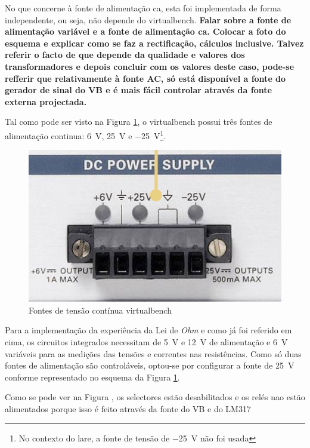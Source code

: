 No que concerne à fonte de alimentação \acrshort{ca}, esta foi implementada de forma independente, ou seja, não depende do \acrshort{virtualbench}. \textbf{Falar sobre a fonte de alimentação variável e a fonte de alimentação \acrshort{ca}. Colocar a foto do esquema e explicar como se faz a rectificação, cálculos inclusive. Talvez referir o facto de que depende da qualidade e valores dos transformadores e depois concluir com os valores deste caso, pode-se refferir que relativamente à fonte AC, só está disponível a fonte do gerador de sinal do VB e é mais fácil controlar através da fonte externa projectada.}

Tal como pode ser visto na Figura \ref{fig:fontes_VB}, o \acrshort{virtualbench} possui três fontes de alimentação continua: \SI{6}{\volt}, \SI{25}{\volt} e \SI{-25}{\volt}\footnote{No contexto do \acrshort{lare}, a fonte de tensão de \SI{-25}{\volt} não foi usada}. 

\begin{figure}[hbtp]
	\centering
	\includegraphics[width=1\textwidth]{figures/fontes_VB.png}
	\caption{Fontes de tensão contínua \acrshort{virtualbench}}
	\label{fig:fontes_VB}
\end{figure}

Para a implementação da experiência da Lei de \textit{Ohm} e como já foi referido em cima, os circuitos integrados necessitam de \SI{5}{\volt} e \SI{12}{\volt} de alimentação e \SI{6}{\volt} variáveis para as medições das tensões e correntes nas resistências. Como só duas fontes de alimentação são controláveis, optou-se por configurar a fonte de \SI{25}{\volt} conforme representado no esquema da Figura \ref{fig:fontes_VB}.

Como se pode ver na Figura , os selectores estão desabilitados e os relés nao estão alimentados porque isso é feito através da fonte do VB e do LM317

